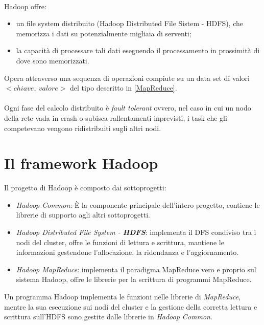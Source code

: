 \documentclass[a4paper,11pt]{report}
\begin{document}
\paragraph{}Hadoop offre:
\begin{itemize}
 \item un file system distribuito (Hadoop Distributed File Sistem - HDFS), che memorizza i dati su potenzialmente migliaia di serventi; 
 \item la capacità di processare tali dati eseguendo il processamento in prossimità di dove sono memorizzati.
\end{itemize}
Opera attraverso una sequenza di operazioni compiute su un data set di valori $<chiave,\ valore>$ del tipo descritto in \ref{MapReduce}.
\paragraph{}
Ogni fase del calcolo distribuito è \emph{fault tolerant} ovvero, nel caso in cui un nodo della rete vada in crash o subisca rallentamenti
inprevisti, i
task che gli competevano vengono ridistribuiti sugli altri nodi.
\section{Il framework Hadoop}
Il progetto di Hadoop è composto dai sottoprogetti:
\begin{itemize}
 \item \emph{Hadoop Common}: È la componente principale dell'intero progetto, contiene le librerie di supporto agli altri sottoprogetti.
 \item \emph{Hadoop Distributed File System - \textbf{HDFS}}: implementa il DFS condiviso tra i nodi del cluster, offre le funzioni di
lettura e scrittura,
      mantiene le informazioni gestendone l'allocazione, la ridondanza e l'aggiornamento.
 \item \emph{Hadoop MapReduce}: implementa il paradigma MapReduce vero e proprio sul sistema Hadoop, offre le librerie per la scrittura di
programmi MapReduce.
\end{itemize}
Un programma Hadoop implementa le funzioni nelle librerie di \emph{MapReduce}, mentre la sua esecuzione sui nodi del cluster e la gestione
della corretta lettura e scrittura 
sull'HDFS sono gestite dalle librerie in \emph{Hadoop Common}.  
\end{document}
